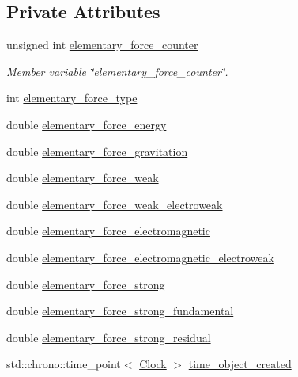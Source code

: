 \subsection*{Private Attributes}
\begin{DoxyCompactItemize}
\item 
unsigned int \mbox{\hyperlink{classElementaryForce_a027c7a909b116a22470f0e359f8c6e5d}{elementary\+\_\+force\+\_\+counter}}
\begin{DoxyCompactList}\small\item\em Member variable \char`\"{}elementary\+\_\+force\+\_\+counter\char`\"{}. \end{DoxyCompactList}\item 
int \mbox{\hyperlink{classElementaryForce_a4e5bcb6ba1b0d2217c6fb757a9370dff}{elementary\+\_\+force\+\_\+type}}
\item 
double \mbox{\hyperlink{classElementaryForce_a994d23e57e813a14120658f883e6c721}{elementary\+\_\+force\+\_\+energy}}
\item 
double \mbox{\hyperlink{classElementaryForce_a6348f87d1bb920e9ab11e624cb543ae0}{elementary\+\_\+force\+\_\+gravitation}}
\item 
double \mbox{\hyperlink{classElementaryForce_a927269eaae5bf8ac3dbd0bc2fd260592}{elementary\+\_\+force\+\_\+weak}}
\item 
double \mbox{\hyperlink{classElementaryForce_a901032dde4f6c7a00d3dc51c5acecdff}{elementary\+\_\+force\+\_\+weak\+\_\+electroweak}}
\item 
double \mbox{\hyperlink{classElementaryForce_a0a26ca7f126214261958f67d5716c6f8}{elementary\+\_\+force\+\_\+electromagnetic}}
\item 
double \mbox{\hyperlink{classElementaryForce_a211ff8cdcd3b78c5fe1b6216bc908346}{elementary\+\_\+force\+\_\+electromagnetic\+\_\+electroweak}}
\item 
double \mbox{\hyperlink{classElementaryForce_a3137ccc3db3e58f16daaf0face93f98d}{elementary\+\_\+force\+\_\+strong}}
\item 
double \mbox{\hyperlink{classElementaryForce_a5a12a7faddd6d0adae5232d4014a9b01}{elementary\+\_\+force\+\_\+strong\+\_\+fundamental}}
\item 
double \mbox{\hyperlink{classElementaryForce_a73ccecd6e432bdf773832bdce6db15b5}{elementary\+\_\+force\+\_\+strong\+\_\+residual}}
\item 
std\+::chrono\+::time\+\_\+point$<$ \mbox{\hyperlink{universe_8h_a0ef8d951d1ca5ab3cfaf7ab4c7a6fd80}{Clock}} $>$ \mbox{\hyperlink{classElementaryForce_a3c0db9aacae297a036837e127a49741d}{time\+\_\+object\+\_\+created}}

\end{DoxyCompactItemize}
